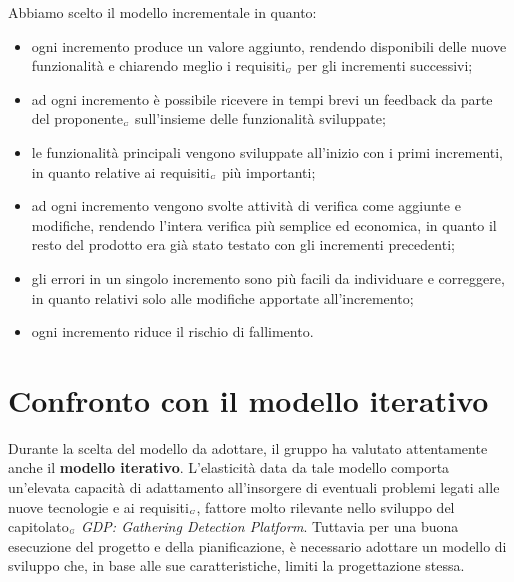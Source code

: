 Abbiamo scelto il modello incrementale in quanto:
\begin{itemize}
	\item ogni incremento produce un valore aggiunto, rendendo disponibili delle nuove funzionalità e chiarendo meglio i requisiti$_{\scaleto{G}{3pt}}$ per gli incrementi successivi;
	\item ad ogni incremento è possibile ricevere in tempi brevi un feedback da parte del proponente$_{\scaleto{G}{3pt}}$ sull'insieme delle funzionalità sviluppate;
	\item le funzionalità principali vengono sviluppate all'inizio con i primi incrementi, in quanto relative ai requisiti$_{\scaleto{G}{3pt}}$ più importanti;
	\item ad ogni incremento vengono svolte attività di verifica come aggiunte e modifiche, rendendo l'intera verifica più semplice ed economica, in quanto il resto del prodotto era già stato testato con gli incrementi precedenti;
	\item gli errori in un singolo incremento sono più facili da individuare e correggere, in quanto relativi solo alle modifiche apportate all'incremento;
	\item ogni incremento riduce il rischio di fallimento.
\end{itemize}

\section{Confronto con il modello iterativo}\label{ModelloDiSviluppoConfrontoConIlModelloIterativo}
Durante la scelta del modello da adottare, il gruppo ha valutato attentamente anche il \textbf{modello iterativo}.
L'elasticità data da tale modello comporta un'elevata capacità di adattamento all'insorgere di eventuali problemi legati alle nuove tecnologie e ai requisiti$_{\scaleto{G}{3pt}}$, fattore molto rilevante nello sviluppo del capitolato$_{\scaleto{G}{3pt}}$ \textit{GDP: Gathering Detection Platform}.
Tuttavia per una buona esecuzione del progetto e della pianificazione, è necessario adottare un modello di sviluppo che, in base alle sue caratteristiche, limiti la progettazione stessa.
